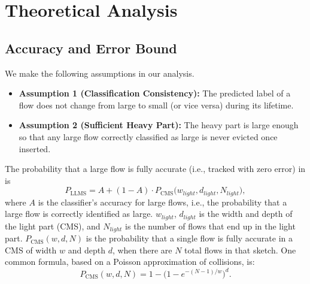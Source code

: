 \section{Theoretical Analysis}


\subsection{Accuracy and Error Bound}


We make the following assumptions in our analysis.


\begin{itemize}[leftmargin=*]
    \item \textbf{Assumption 1 (Classification Consistency):} The predicted label of a flow does not change from large to small (or vice versa) during its lifetime.

    \item \textbf{Assumption 2 (Sufficient Heavy Part):} The heavy part is large enough so that any large flow correctly classified as large is never evicted once inserted.
\end{itemize}




\begin{theorem}
\label{theorem:full_accurate}
%
The probability that a large flow is fully accurate (i.e., tracked with zero error) in \alg{} is
%
\[
  P_{\mathrm{LLMS}} = A + (1 - A) \cdot P_{\mathrm{CMS}} \bigl(w_{light}, d_{light}, N_{light}\bigr),
\]
%
where \(A\) is the classifier's accuracy for large flows, i.e., the probability that a large flow is correctly identified as large.
%
\(w_{light}\), \(d_{light}\) is the width and depth of the light part (CMS), and \(N_{light}\) is the number of flows that end up in the light part.
%
\(P_{\mathrm{CMS}}(w, d, N)\) is the probability that a single flow is fully accurate in a CMS of width \(w\) and depth \(d\), when there are \(N\) total flows in that sketch. One common formula, based on a Poisson approximation of collisions, is:
\[
  P_{\mathrm{CMS}}(w, d, N) = 1 - \bigl(1 - e^{-(N-1)/w}\bigr)^{d}.
\]
\end{theorem}


